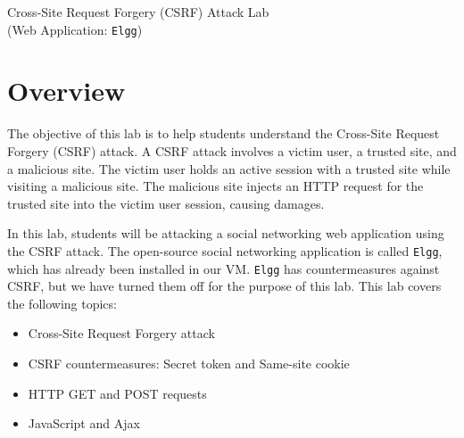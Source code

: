 
\newcommand{\commonfolder}{../../common-files}
\newcommand{\webcommon}{../Web_Common}








\begin{center}
{\LARGE Cross-Site Request Forgery (CSRF) Attack Lab}
\vspace{0.1in}\\
{\Large (Web Application: {\tt Elgg})}
\end{center}




\section{Overview}


The objective of this lab is to help students understand the Cross-Site Request
Forgery (CSRF) attack. A CSRF attack involves a victim user, a
trusted site, and a malicious site. The victim user holds an active session
with a trusted site while visiting a malicious site. The
malicious site injects an HTTP request for the trusted site into the victim
user session, causing damages.

In this lab, students  will be attacking a social networking web
application using the CSRF attack. The open-source social networking application is called 
\texttt{Elgg}, which has already been installed in our VM.
\texttt{Elgg} has countermeasures against CSRF, but we have turned them off for the
purpose of this lab.  This lab covers the following topics:

\begin{itemize}[noitemsep]
 \item Cross-Site Request Forgery attack
 \item CSRF countermeasures: Secret token and Same-site cookie
 \item HTTP GET and POST requests
 \item JavaScript and Ajax
\end{itemize}


